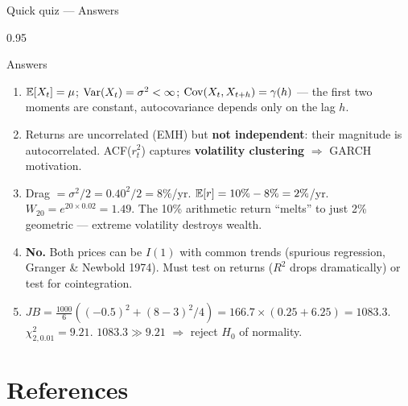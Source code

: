 \documentclass[9pt, aspectratio=169, t]{beamer}
\begin{document}
\begin{frame}[shrink=5]{Quick quiz --- Answers}
    \begin{cminipage}{0.95\textwidth}
    \begin{exampleblock}{Answers}
    \begin{enumerate}\setlength{\itemsep}{0pt}
        \item $\mathbb{E}[X_t] = \mu$; \; $\text{Var}(X_t) = \sigma^2 < \infty$; \; $\text{Cov}(X_t, X_{t+h}) = \gamma(h)$ --- the first two moments are constant, autocovariance depends only on the lag $h$.
        \vspace{0.05cm}
        \item Returns are uncorrelated (EMH) but \textbf{not independent}: their magnitude is autocorrelated. ACF($r_t^2$) captures \textbf{volatility clustering} $\Rightarrow$ GARCH motivation.
        \vspace{0.05cm}
        \item Drag $= \sigma^2/2 = 0.40^2/2 = 8\%$/yr. $\mathbb{E}[r] = 10\% - 8\% = 2\%$/yr. $W_{20} = e^{20 \times 0.02} = 1.49$. The 10\% arithmetic return ``melts'' to just 2\% geometric --- extreme volatility destroys wealth.
        \vspace{0.05cm}
        \item \textbf{No.} Both prices can be $I(1)$ with common trends (spurious regression, Granger \& Newbold 1974). Must test on returns ($R^2$ drops dramatically) or test for cointegration.
        \vspace{0.05cm}
        \item $JB = \frac{1000}{6}((-0.5)^2 + (8-3)^2/4) = 166.7 \times (0.25 + 6.25) = \mathbf{1083.3}$. $\chi^2_{2, 0.01} = 9.21$. $1083.3 \gg 9.21$ $\Rightarrow$ reject $H_0$ of normality.
    \end{enumerate}
    \end{exampleblock}
    \end{cminipage}
\end{frame}

\section{References}
\end{document}
